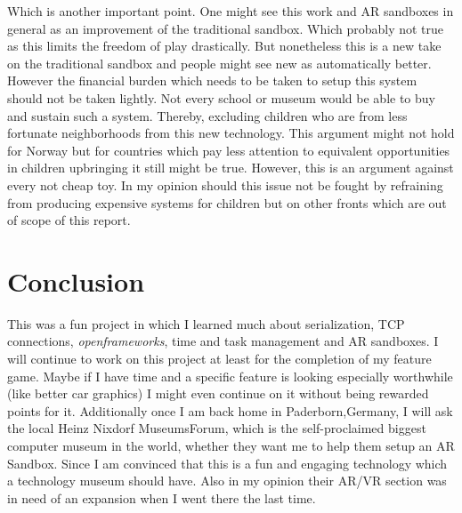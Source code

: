 \documentclass[12pt,a4paper,twoside,titlepage,headsepline,numbers=noenddot,listof=totoc,index=totoc,bibliography=totoc]{scrartcl}
\theoremstyle{break}
\begin{document}
Which is another important point. One might see this work and AR sandboxes in general as an improvement of the traditional sandbox. Which probably not true as this limits the freedom of play drastically. But nonetheless this is a new take on the traditional sandbox and people might see new as automatically better. However the financial burden which needs to be taken to setup this system should not be taken lightly. Not every school or museum would be able to buy and sustain such a system. Thereby, excluding children who are from less fortunate neighborhoods from this new technology. This argument might not hold for Norway but for countries which pay less attention to equivalent opportunities in children upbringing it still might be true.  However, this is an argument against every not cheap toy. In my opinion should this issue not be fought by refraining from producing expensive systems for children but on other fronts which are out of scope of this report.

\section{Conclusion}
This was a fun project in which I learned much about serialization, TCP connections,  \textit{openframeworks}, time and task management and AR sandboxes. I will continue to work on this project at least for the completion of my feature game. Maybe if I have time and a specific feature is looking especially worthwhile (like better car graphics) I might even continue on it without being rewarded points for it.
Additionally once I am back home in Paderborn,Germany, I will ask the local Heinz Nixdorf MuseumsForum, which is the self-proclaimed biggest computer museum in the world, whether they want me to help them setup an AR Sandbox. Since I am convinced that this is a fun and engaging technology which a technology museum should have. Also in my opinion their AR/VR section was in need of an expansion when I went there the last time. 


\end{document}
